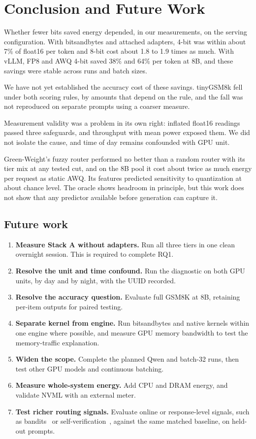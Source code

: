 \chapter{Conclusion and Future Work}
Whether fewer bits saved energy depended, in our measurements, on the serving configuration. With bitsandbytes and attached adapters, 4-bit was within about 7\% of float16 per token and 8-bit cost about 1.8 to 1.9 times as much. With vLLM, FP8 and AWQ 4-bit saved 38\% and 64\% per token at 8B, and these savings were stable across runs and batch sizes.

We have not yet established the accuracy cost of these savings. tinyGSM8k fell under both scoring rules, by amounts that depend on the rule, and the fall was not reproduced on separate prompts using a coarser measure.

Measurement validity was a problem in its own right: inflated float16 readings passed three safeguards, and throughput with mean power exposed them. We did not isolate the cause, and time of day remains confounded with GPU unit.

Green-Weight's fuzzy router performed no better than a random router with its tier mix at any tested cut, and on the 8B pool it cost about twice as much energy per request as static AWQ. Its features predicted sensitivity to quantization at about chance level. The oracle shows headroom in principle, but this work does not show that any predictor available before generation can capture it.

\section{Future work}
\begin{enumerate}\setlength{\itemsep}{0pt}\setlength{\parskip}{0pt}
\item \textbf{Measure Stack A without adapters.} Run all three tiers in one clean overnight session. This is required to complete RQ1.
\item \textbf{Resolve the unit and time confound.} Run the diagnostic on both GPU units, by day and by night, with the UUID recorded.
\item \textbf{Resolve the accuracy question.} Evaluate full GSM8K at 8B, retaining per-item outputs for paired testing.
\item \textbf{Separate kernel from engine.} Run bitsandbytes and native kernels within one engine where possible, and measure GPU memory bandwidth to test the memory-traffic explanation.
\item \textbf{Widen the scope.} Complete the planned Qwen and batch-32 runs, then test other GPU models and continuous batching.
\item \textbf{Measure whole-system energy.} Add CPU and DRAM energy, and validate NVML with an external meter.
\item \textbf{Test richer routing signals.} Evaluate online or response-level signals, such as bandits~\cite{b48} or self-verification~\cite{b31}, against the same matched baseline, on held-out prompts.
\end{enumerate}
